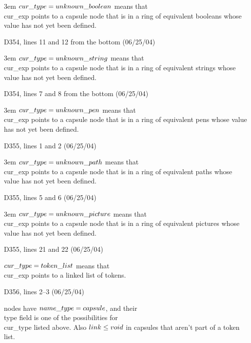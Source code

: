 {{\noindent\hangindent 3em
$\\{cur\_type}=\\{unknown\_boolean}$ means that \\{cur\_exp} points to a
capsule node that is in
a ring of equivalent booleans whose value has not yet been defined.

\bugonpage D354, lines 11 and 12 from the bottom (06/25/04)

\noindent\hangindent 3em
$\\{cur\_type}=\\{unknown\_string}$ means that \\{cur\_exp} points to a
capsule node that is in
a ring of equivalent strings whose value has not yet been defined.

\bugonpage D354, lines 7 and 8 from the bottom (06/25/04)

\noindent\hangindent 3em
$\\{cur\_type}=\\{unknown\_pen}$ means that \\{cur\_exp} points to a
capsule node that is in
a ring of equivalent pens whose value has not yet been defined.

\bugonpage D355, lines 1 and 2 (06/25/04)

\noindent\hangindent 3em
$\\{cur\_type}=\\{unknown\_path}$ means that \\{cur\_exp} points to a
capsule node that is in
a ring of equivalent paths whose value has not yet been defined.

\bugonpage D355, lines 5 and 6 (06/25/04)

\noindent\hangindent 3em
$\\{cur\_type}=\\{unknown\_picture}$ means that \\{cur\_exp} points to a
capsule node that is in
a ring of equivalent pictures whose value has not yet been defined.

\bugonpage D355, lines 21 and 22 (06/25/04)

\noindent
$\\{cur\_type}=\\{token\_list}$ means that \\{cur\_exp} points to a linked list
of tokens.

\bugonpage D356, lines 2--3 (06/25/04)

\noindent
nodes have $\\{name\_type}=\\{capsule}$,
and their \\{type} field is one of the possibilities for \\{cur\_type}
listed above.
Also $\\{link}\le\\{void}$ in capsules that aren't part of a token list.

}}
